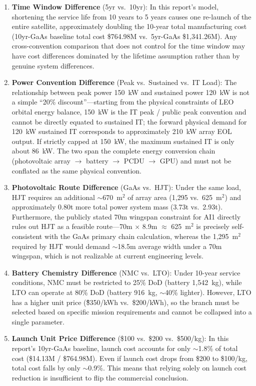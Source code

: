 \begin{enumerate}
  \item \textbf{Time Window Difference} (5yr vs.\ 10yr): In this report's model, shortening the service life from 10 years to 5 years causes one re-launch of the entire satellite, approximately doubling the 10-year total manufacturing cost (10yr-GaAs baseline total cost \$764.98M vs.\ 5yr-GaAs \$1,341.26M). Any cross-convention comparison that does not control for the time window may have cost differences dominated by the lifetime assumption rather than by genuine system differences.
  
  \item \textbf{Power Convention Difference} (Peak vs.\ Sustained vs.\ IT Load): The relationship between peak power 150~kW and sustained power 120~kW is not a simple ``20\% discount''---starting from the physical constraints of LEO orbital energy balance, 150~kW is the IT peak / public peak convention and cannot be directly equated to sustained IT; the forward physical demand for 120~kW sustained IT corresponds to approximately 210~kW array EOL output. If strictly capped at 150~kW, the maximum sustained IT is only about 86~kW. The two span the complete energy conversion chain (photovoltaic array $\to$ battery $\to$ PCDU $\to$ GPU) and must not be conflated as the same physical convention.

  \item \textbf{Photovoltaic Route Difference} (GaAs vs.\ HJT): Under the same load, HJT requires an additional $\sim$670~m$^2$ of array area (1,295 vs.\ 625~m$^2$) and approximately 0.80t more total power system mass (3.73t vs.\ 2.93t). Furthermore, the publicly stated 70m wingspan constraint for AI1 directly rules out HJT as a feasible route---70m $\times$ 8.9m $\approx$ 625~m$^2$ is precisely self-consistent with the GaAs primary chain calculation, whereas the 1,295~m$^2$ required by HJT would demand $\sim$18.5m average width under a 70m wingspan, which is not realizable at current engineering levels.

  \item \textbf{Battery Chemistry Difference} (NMC vs.\ LTO): Under 10-year service conditions, NMC must be restricted to 25\% DoD (battery 1,542~kg), while LTO can operate at 80\% DoD (battery 916~kg, $\sim$40\% lighter). However, LTO has a higher unit price (\~\$350/kWh vs.\ \$200/kWh), so the branch must be selected based on specific mission requirements and cannot be collapsed into a single parameter.

  \item \textbf{Launch Unit Price Difference} (\$100 vs.\ \$200 vs.\ \$500/kg): In this report's 10yr-GaAs baseline, launch cost accounts for only $\sim$1.8\% of total cost (\$14.13M / \$764.98M). Even if launch cost drops from \$200 to \$100/kg, total cost falls by only $\sim$0.9\%. This means that relying solely on launch cost reduction is insufficient to flip the commercial conclusion.


\end{enumerate}
